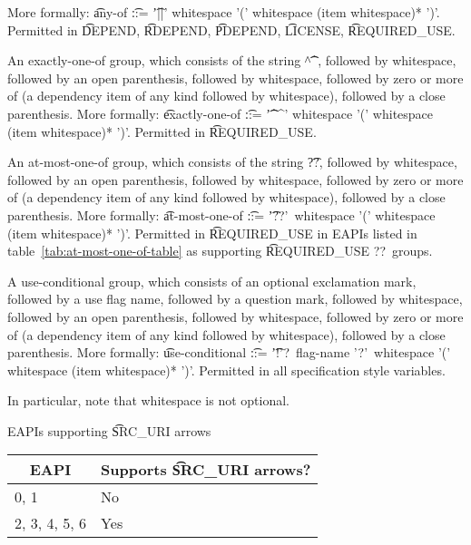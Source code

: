 \begin{compactitem}
    More formally: \t{any-of} \t{::=} \t{'||' whitespace '(' whitespace (item whitespace)* ')'}.
    Permitted in \t{DEPEND}, \t{RDEPEND}, \t{PDEPEND}, \t{LICENSE}, \t{REQUIRED\_USE}.
\item An exactly-one-of group, which consists of the string \t{\textasciicircum\textasciicircum},
    followed by whitespace, followed by an open parenthesis, followed by whitespace, followed by
    zero or more of (a dependency item of any kind followed by whitespace), followed by a close
    parenthesis. More formally: \t{exactly-one-of} \t{::=} \t{'\textasciicircum\textasciicircum'
    whitespace '(' whitespace (item whitespace)* ')'}.
    Permitted in \t{REQUIRED\_USE}.
\item {} An at-most-one-of group, which consists of the string \t{??},
    followed by whitespace, followed by an open parenthesis, followed by whitespace, followed by
    zero or more of (a dependency item of any kind followed by whitespace), followed by a close
    parenthesis. More formally: \t{at-most-one-of} \t{::=} \t{'??'\ whitespace '(' whitespace
    (item whitespace)* ')'}. Permitted in \t{REQUIRED\_USE} in EAPIs listed in
    table~\ref{tab:at-most-one-of-table} as supporting \t{REQUIRED\_USE ??}\ groups.
\item A use-conditional group, which consists of an optional exclamation mark, followed by
    a use flag name, followed by a question mark, followed by whitespace, followed by
    an open parenthesis, followed by whitespace, followed by zero or more of (a dependency item
    of any kind followed by whitespace), followed by a close parenthesis. More formally:
    \t{use-conditional} \t{::=} \t{'!'?\ flag-name '?'\ whitespace '(' whitespace (item
    whitespace)* ')'}.
    Permitted in all specification style variables.
\end{compactitem}

In particular, note that whitespace is not optional.

\begin{centertable}{EAPIs supporting \t{SRC\_URI} arrows}
    \label{tab:uri-arrows-table}
    \begin{tabular}{ll}
      \toprule
      \multicolumn{1}{c}{\textbf{EAPI}} &
      \multicolumn{1}{c}{\textbf{Supports \t{SRC\_URI} arrows?}} \\
      \midrule
      0, 1              & No  \\
      2, 3, 4, 5, 6     & Yes \\
      \bottomrule
    \end{tabular}
\end{centertable}

